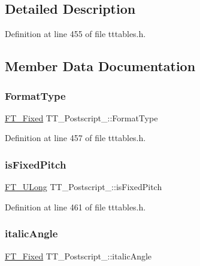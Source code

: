 \subsection{Detailed Description}


Definition at line 455 of file tttables.\+h.



\subsection{Member Data Documentation}
\mbox{\label{struct_t_t___postscript___a5ed6585c01fa4ffc3f8537d58bdd955f}} 
\subsubsection{\texorpdfstring{FormatType}{FormatType}}
{\footnotesize\ttfamily \mbox{\hyperlink{fttypes_8h_a5f5a679cc09f758efdd0d1c5feed3c3d}{F\+T\+\_\+\+Fixed}} T\+T\+\_\+\+Postscript\+\_\+\+::\+Format\+Type}



Definition at line 457 of file tttables.\+h.

\mbox{\label{struct_t_t___postscript___ab9a537994be4f81cb35f61f83cd97949}} 
\subsubsection{\texorpdfstring{isFixedPitch}{isFixedPitch}}
{\footnotesize\ttfamily \mbox{\hyperlink{fttypes_8h_a4fac88bdba78eb76b505efa6e4fbf3f5}{F\+T\+\_\+\+U\+Long}} T\+T\+\_\+\+Postscript\+\_\+\+::is\+Fixed\+Pitch}



Definition at line 461 of file tttables.\+h.

\mbox{\label{struct_t_t___postscript___adcca36c7fbcbdff00fc8c2884a215830}} 
\subsubsection{\texorpdfstring{italicAngle}{italicAngle}}
{\footnotesize\ttfamily \mbox{\hyperlink{fttypes_8h_a5f5a679cc09f758efdd0d1c5feed3c3d}{F\+T\+\_\+\+Fixed}} T\+T\+\_\+\+Postscript\+\_\+\+::italic\+Angle}



